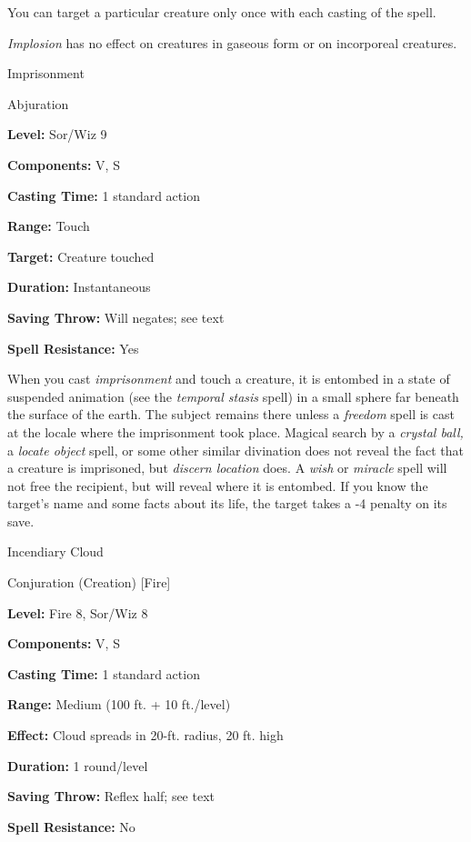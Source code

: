 \documentclass{article}
\begin{document}
You can target a particular creature only once with each casting of the spell.

\textit{Implosion }has no effect on creatures in gaseous form or on incorporeal 
creatures.

\vspace{12pt}
Imprisonment

Abjuration

\textbf{Level:} Sor/Wiz 9

\textbf{Components:} V, S

\textbf{Casting Time:} 1 standard action

\textbf{Range:} Touch

\textbf{Target:} Creature touched

\textbf{Duration:} Instantaneous

\textbf{Saving Throw: }Will negates; see text

\textbf{Spell Resistance:} Yes

When you cast \textit{imprisonment }and touch a creature, it is entombed in a state 
of suspended animation (see the \textit{temporal stasis }spell) in a small sphere 
far beneath the surface of the earth. The subject remains there unless a \textit{freedom 
}spell is cast at the locale where the imprisonment took place. Magical search 
by a \textit{crystal ball, }a \textit{locate object }spell, or some other similar 
divination does not reveal the fact that a creature is imprisoned, but \textit{discern 
location }does. A \textit{wish }or \textit{miracle }spell will not free the recipient, 
but will reveal where it is entombed. If you know the target's name and some facts 
about its life, the target takes a -4 penalty on its save.

\vspace{12pt}
Incendiary Cloud

Conjuration (Creation) [Fire]

\textbf{Level:} Fire 8, Sor/Wiz 8

\textbf{Components:} V, S

\textbf{Casting Time:} 1 standard action

\textbf{Range: }Medium (100 ft. + 10 ft./level)

\textbf{Effect:} Cloud spreads in 20-ft. radius, 20 ft. high

\textbf{Duration:} 1 round/level

\textbf{Saving Throw:} Reflex half; see text

\textbf{Spell Resistance:} No
\end{document}
